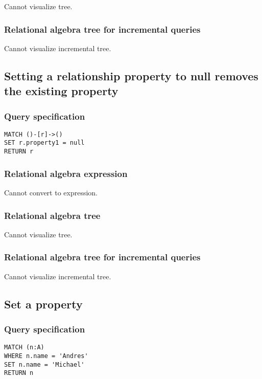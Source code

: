 Cannot visualize tree.

\subsubsection*{Relational algebra tree for incremental queries}

Cannot visualize incremental tree.

\subsection{Setting a relationship property to null removes the existing property}

\subsubsection*{Query specification}

\begin{lstlisting}
MATCH ()-[r]->()
SET r.property1 = null
RETURN r
\end{lstlisting}

\subsubsection*{Relational algebra expression}

Cannot convert to expression.

\subsubsection*{Relational algebra tree}

Cannot visualize tree.

\subsubsection*{Relational algebra tree for incremental queries}

Cannot visualize incremental tree.

\subsection{Set a property}

\subsubsection*{Query specification}

\begin{lstlisting}
MATCH (n:A)
WHERE n.name = 'Andres'
SET n.name = 'Michael'
RETURN n
\end{lstlisting}

